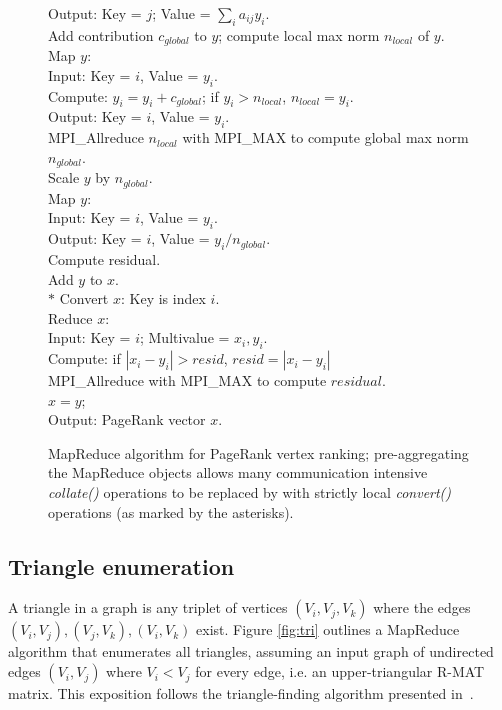 \begin{figure}[htb]
\begin{center}
{\begin{minipage}{\textwidth}
\begin{tabbing}
\> \> \> Output:  Key = $j$; Value = $\sum_i a_{ij} y_i$. \\
\> Add contribution $c_{global}$ to $y$; compute local max norm $n_{local}$ of $y$. \\
\> \> Map $y$:  \\
\> \> \> Input:  Key = $i$, Value = $y_i$. \\
\> \> \> Compute: $y_i = y_i + c_{global}$; if $y_i > {n_{local}}$, $n_{local} = y_i$. \\
\> \> \> Output:  Key = $i$, Value = $y_i$. \\
\> \> MPI\_Allreduce $n_{local}$ with MPI\_MAX to compute global max norm $n_{global}$. \\
\> Scale $y$ by $n_{global}$. \\
\> \> Map $y$: \\
\> \> \> Input:  Key = $i$, Value = $y_i$. \\
\> \> \> Output:  Key = $i$, Value = $y_i / {n_{global}}$. \\
\> Compute residual. \\
\> \> Add $y$ to $x$. \\
$*$\> \> Convert $x$:  Key is index $i$. \\
\> \> Reduce $x$:   \\
\> \> \> Input:  Key = $i$; Multivalue = $x_i, y_i$. \\
\> \> \> Compute:  if $|x_i - y_i| > {resid}$, ${resid} = |x_i - y_i|$ \\
\> \> MPI\_Allreduce with MPI\_MAX to compute $residual$. \\
\> $x = y$; \\
Output:  PageRank vector $x$.
  \end{tabbing}
 \end{minipage}}\end{center}

 \caption{MapReduce algorithm for PageRank vertex ranking; pre-aggregating the MapReduce objects allows many communication intensive {\it collate()} 
operations to be replaced by with strictly local {\it convert()} operations (as marked by the asterisks).}

 \label{fig:pr2}
\end{figure}


\subsection{Triangle enumeration}

A triangle in a graph is any triplet of vertices $(V_i,V_j,V_k)$ where
the edges $(V_i,V_j), (V_j,V_k), (V_i,V_k)$ exist.  Figure
\ref{fig:tri} outlines a MapReduce algorithm that enumerates all
triangles, assuming an input graph of undirected edges $(V_i,V_j)$
where $V_i < V_j$ for every edge, i.e. an upper-triangular R-MAT
matrix.  This exposition follows the triangle-finding algorithm
presented in~\cite{Cohen09}.

